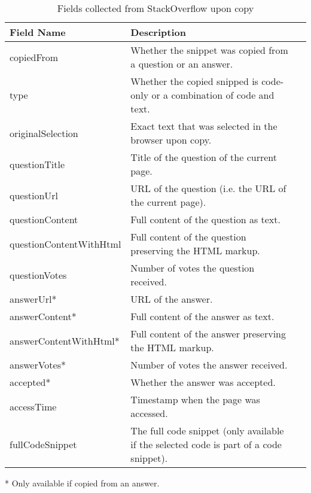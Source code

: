 \documentclass[../manifest.tex]{subfiles}
\begin{document}
\begin{table*}[t]
    \centering
    \begin{threeparttable}
    \begin{tabular*}{\textwidth}{lll}
    \hline
    \textbf{Field Name} & \textbf{Description} \\
    \hline
    copiedFrom                  & Whether the snippet was copied from a question or an answer.\\
    type                        & Whether the copied snipped is code-only or a combination of code and text.\\
    originalSelection           & Exact text that was selected in the browser upon copy.\\
    questionTitle               & Title of the question of the current page.\\
    questionUrl                 & URL of the question (i.e. the URL of the current page).\\
    questionContent             & Full content of the question as text.\\
    questionContentWithHtml     & Full content of the question preserving the HTML markup.\\
    questionVotes               & Number of votes the question received.\\
    answerUrl*                  & URL of the answer.\\
    answerContent*              & Full content of the answer as text.\\
    answerContentWithHtml*      & Full content of the answer preserving the HTML markup.\\
    answerVotes*                & Number of votes the answer received.\\
    accepted*                   & Whether the answer was accepted.\\
    accessTime                  & Timestamp when the page was accessed.\\
    fullCodeSnippet             & The full code snippet (only available if the selected code is part of a code snippet).\\
    \hline
    \end{tabular*}
    \begin{tablenotes}\footnotesize
        \item [*] Only available if copied from an answer.
    \end{tablenotes}
    \end{threeparttable}
    \caption{Fields collected from StackOverflow upon copy}
    \label{tab:chrome-extension-fields}
\end{table*}
\end{document}
